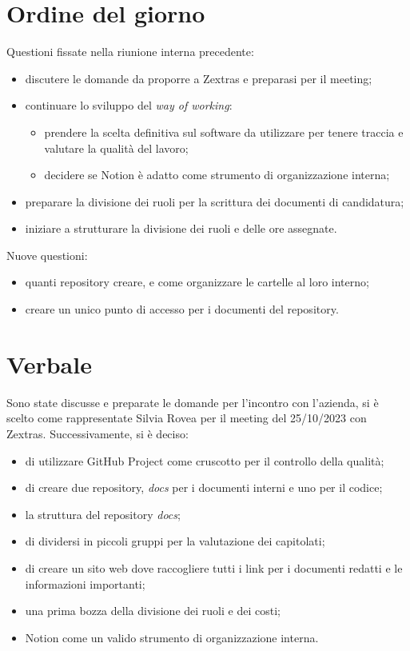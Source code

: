 \documentclass[12pt]{article}
\begin{document}
    \section{Ordine del giorno}
    Questioni fissate nella riunione interna precedente:
    \begin{itemize}
    	\item discutere le domande da proporre a Zextras e preparasi per il meeting; 
    	\item continuare lo sviluppo del \emph{way of working}:
    	\begin{itemize}
    		\item prendere la scelta definitiva sul software da utilizzare per tenere traccia e valutare la qualità del lavoro;
    		\item decidere se Notion è adatto come strumento di organizzazione interna;
    	\end{itemize}
    	\item preparare la divisione dei ruoli per la scrittura dei documenti di candidatura;
    	\item iniziare a strutturare la divisione dei ruoli e delle ore assegnate.
    \end{itemize}
    Nuove questioni:
    \begin{itemize}
    	\item quanti repository creare, e come organizzare le cartelle al loro interno;
    	\item creare un unico punto di accesso per i documenti del repository.
    \end{itemize}
    
    \section{Verbale}
    Sono state discusse e preparate le domande per l'incontro con l'azienda, si è scelto come rappresentate
    Silvia Rovea per il meeting del 25/10/2023 con Zextras. Successivamente, si è deciso:
    \begin{itemize}
    	\item di utilizzare GitHub Project come cruscotto per il controllo della qualità;
    	\item di creare due repository, \emph{docs} per i documenti interni e uno per il codice;
    	\item la struttura del repository \emph{docs};
    	\item di dividersi in piccoli gruppi per la valutazione dei capitolati;
    	\item di creare un sito web dove raccogliere tutti i link per i documenti redatti e le informazioni importanti;
    	\item una prima bozza della divisione dei ruoli e dei costi;
    	\item Notion come un valido strumento di organizzazione interna.
    \end{itemize} 
    
\end{document}
